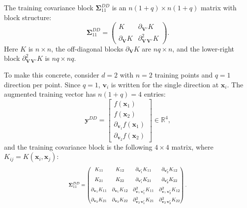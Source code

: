 \documentclass[12pt]{article}
\begin{document}
The training covariance block $\boldsymbol{\Sigma}_{11}^{DD}$ is an $n(1+q) \times n(1+q)$ matrix with block structure:
\begin{equation}
	\label{eqn:ddgp_bg_S11}
	\boldsymbol{\Sigma}_{11}^{DD} =
	\begin{pmatrix}
		K & \partial_{\mathbf{V}'} K \\
		\partial_{\mathbf{V}} K & \partial^2_{\mathbf{V}\,\mathbf{V}'} K
	\end{pmatrix}.
\end{equation}
Here $K$ is $n \times n$, the off-diagonal blocks $\partial_{\mathbf{V}} K$ are $nq \times n$, and the lower-right block $\partial^2_{\mathbf{V}\,\mathbf{V}'} K$ is $nq \times nq$.

To make this concrete, consider $d = 2$ with $n = 2$ training points and $q = 1$ direction per point. Since $q = 1$,  $\mathbf{v}_i$ is written for the single direction at $\mathbf{x}_i$. The augmented training vector has $n(1+q) = 4$ entries:
\begin{equation}
	\label{eqn:ddgp_aug_vector_2d}
	\mathbf{y}^{DD} = \begin{bmatrix} f(\mathbf{x}_1) \\ f(\mathbf{x}_2) \\ \partial_{\mathbf{v}_1} f(\mathbf{x}_1) \\ \partial_{\mathbf{v}_2} f(\mathbf{x}_2) \end{bmatrix} \in \mathbb{R}^{4},
\end{equation}
and the training covariance block is the following $4 \times 4$ matrix, where $K_{ij} = K(\mathbf{x}_i, \mathbf{x}_j)$:
\begin{equation}
	\label{eqn:ddgp_S11_2d}
	\resizebox{0.50\textwidth}{!}{$\displaystyle
	\boldsymbol{\Sigma}_{11}^{DD} =
	\begin{pmatrix}
		K_{11} & K_{12} & \partial_{\mathbf{v}_1'} K_{11} & \partial_{\mathbf{v}_2'} K_{12} \\[8pt]
		K_{21} & K_{22} & \partial_{\mathbf{v}_1'} K_{21} & \partial_{\mathbf{v}_2'} K_{22} \\[8pt]
		\partial_{\mathbf{v}_1} K_{11} & \partial_{\mathbf{v}_1} K_{12} & \partial^2_{\mathbf{v}_1\,\mathbf{v}_1'} K_{11} & \partial^2_{\mathbf{v}_1\,\mathbf{v}_2'} K_{12} \\[8pt]
		\partial_{\mathbf{v}_2} K_{21} & \partial_{\mathbf{v}_2} K_{22} & \partial^2_{\mathbf{v}_2\,\mathbf{v}_1'} K_{21} & \partial^2_{\mathbf{v}_2\,\mathbf{v}_2'} K_{22}
	\end{pmatrix}.
	$}
\end{equation}
\end{document}
